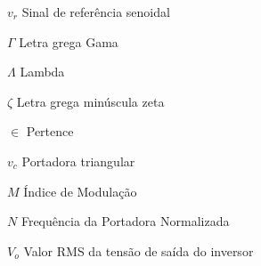 \begin{simbolos}
  \item{$ v_r $} Sinal de referência senoidal
  \item[$ \Gamma $] Letra grega Gama
  \item[$ \Lambda $] Lambda
  \item[$ \zeta $] Letra grega minúscula zeta
  \item[$ \in $] Pertence
  \item{$ v_c $} Portadora triangular
  \item{$ M $} Índice de Modulação
  \item{$ N $} Frequência da Portadora Normalizada
  \item{$ V_o $} Valor RMS da tensão de saída do inversor
  
\end{simbolos}
